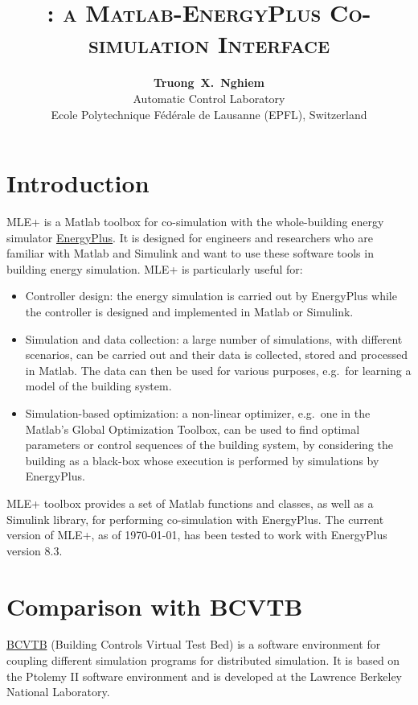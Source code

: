 \documentclass[11pt,letter]{article}
\title{\scshape \MLEP: a Matlab-EnergyPlus Co-simulation Interface}
\author{\textbf{Truong~X.~Nghiem}\\
Automatic Control Laboratory\\
Ecole Polytechnique F\'{e}d\'{e}rale de Lausanne (EPFL), Switzerland}
\date{}
\newcommand{\MLEP}{MLE+\xspace}
\begin{document}
\maketitle

\tableofcontents{}

\section{Introduction}
\label{sec:introduction}

\MLEP is a Matlab toolbox for co-simulation with the whole-building
energy simulator \href{http://apps1.eere.energy.gov/buildings/energyplus/}{EnergyPlus}.  It is designed for engineers and researchers who are
familiar with Matlab and Simulink and want to use these software
tools in building energy simulation.  \MLEP is particularly useful for:
\begin{itemize}
\item Controller design: the energy simulation is carried out by
  EnergyPlus while the controller is designed and implemented in
  Matlab or Simulink.
\item Simulation and data collection: a large
  number of simulations, with different scenarios, can be carried out
  and their data is collected, stored and processed in Matlab.  The
  data can then be used for various purposes, e.g.\ for learning a
  model of the building system.
\item Simulation-based optimization: a
  non-linear optimizer, e.g.\ one in the Matlab's Global Optimization
  Toolbox, can be used to find optimal parameters or control sequences
  of the building system, by considering the building as a black-box
  whose execution is performed by simulations by EnergyPlus.
\end{itemize}

\MLEP toolbox provides a set of Matlab functions and classes, as well
as a Simulink library, for performing co-simulation with EnergyPlus.
The current version of \MLEP, as of \today{}, has been tested to work with EnergyPlus version 8.3.


\section{Comparison with BCVTB}
\label{sec:comparison-bcvtb}

\href{https://gaia.lbl.gov/bcvtb}{BCVTB} (Building Controls Virtual Test Bed) is a software environment for coupling different simulation programs for distributed simulation.
It is based on the Ptolemy II software environment and is developed at the Lawrence
Berkeley National Laboratory.
\end{document}
